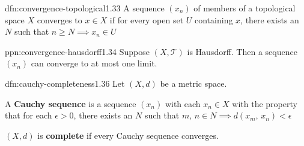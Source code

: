 \documentclass[landscape, 8pt]{extarticle}
\begin{document}
\begin{multicols}{3}
\begin{dfn}{dfn:convergence-topological}{1.33}
    A sequence $(x_{n})$ of members of a topological space $X$ converges to $x\in X$ if for every open set $U$ containing $x$, there exists an $N$ such that $n \ge N \implies x_{n} \in U$
\end{dfn}

\begin{ppn}{ppn:convergence-hausdorff}{1.34}
    Suppose $(X, \mathcal{T})$ is Hausdorff. Then a sequence $(x_{n})$ can converge to at most one limit.
\end{ppn}

\begin{dfn}{dfn:cauchy-completeness}{1.36}
    Let $(X, d)$ be a metric space.
    \begin{enumerate-tight}
        \item A \textbf{Cauchy sequence} is a sequence $(x_{n})$ with each $x_{n}\in X$ with the property that for each $\epsilon > 0$, there exists an $N$ such that $m,\,n\in N \implies d(x_{m},\,x_{n})< \epsilon$
        \item $(X, d)$ is \textbf{complete} if every Cauchy sequence converges.
    \end{enumerate-tight}
\end{dfn}

\lipsum[1-12]
\end{multicols}
\end{document}

